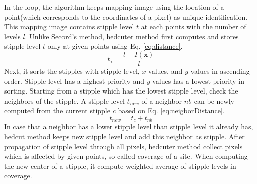 \documentclass[11pt]{article}
\begin{document}
In the loop, the algorithm keeps mapping image using the location of a point(which corresponds to the coordinates of a pixel) as unique identification.
This mapping image contains stipple level $t$ at each points with the number of levels $l$.
Unlike Secord's method\cite{secord02}, hedcuter method first computes and stores stipple level $t$ only at given points using Eq. \ref{eq:distance}.
\begin{equation}\label{eq:distance}
t_{\mathbf{x}}=\frac{l-I(\mathbf{x})}{l}%
\end{equation}
Next, it sorts the stipples with stipple level, $x$ values, and $y$ values in ascending order.
Stipple level has a highest priority and $y$ values has a lowest priority in sorting.
Starting from a stipple which has the lowest stipple level, check the neighbors of the stipple.
A stipple level $t_{new}$ of a neighbor $nb$ can be newly computed from the current stipple $c$ based on Eq. \ref{eq:neigborDistance}.
\begin{equation}\label{eq:neigborDistance}
t_{new}=t_{c} + t_{nb}
\end{equation}
In case that a neighbor has a lower stipple level than stipple level it already has, hedcut method keeps new stipple level and add this neighbor as stipple.
After propagation of stipple level through all pixels, hedcuter method collect pixels which is affected by given points, so called coverage of a site.
When computing the new center of a stipple, it compute weighted average of stipple levels in coverage.
\end{document}
